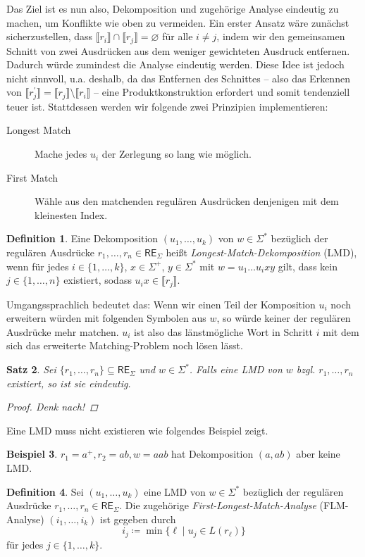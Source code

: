 \documentclass[11pt, a4paper]{article}
\theoremstyle{definition}
\newtheorem{definition}{Definition}[section]
\newtheorem{example}[definition]{Beispiel}
\theoremstyle{plain}
\newtheorem{theorem}[definition]{Satz}
\numberwithin{equation}{section}
\let\emptyset\varnothing
\begin{document}
Das Ziel ist es nun also, Dekomposition und zugehörige Analyse eindeutig zu machen, um Konflikte wie oben zu vermeiden. Ein erster Ansatz wäre zunächst sicherzustellen, dass $\llbracket r_i \rrbracket \cap \llbracket r_j \rrbracket = \emptyset$ für alle $i \neq j$, indem wir den gemeinsamen Schnitt von zwei Ausdrücken aus dem weniger gewichteten Ausdruck entfernen. Dadurch würde zumindest die Analyse eindeutig werden. Diese Idee ist jedoch nicht sinnvoll, u.a. deshalb, da das Entfernen des Schnittes -- also das Erkennen von $\llbracket r_j^\prime \rrbracket = \llbracket r_j \rrbracket \setminus \llbracket r_i \rrbracket$ -- eine Produktkonstruktion erfordert und somit tendenziell teuer ist. Stattdessen werden wir folgende zwei Prinzipien implementieren:
\begin{description}
	\item[Longest Match] Mache jedes $u_i$ der Zerlegung so lang wie möglich.
	\item[First Match] Wähle aus den matchenden regulären Ausdrücken denjenigen mit dem kleinesten Index.
\end{description}
\begin{definition}
	Eine Dekomposition $(u_1, \ldots, u_k)$ von $w \in \Sigma^\ast$ bezüglich der regulären Ausdrücke $r_1, \ldots, r_n \in \mathsf{RE}_\Sigma$ heißt \textit{Longest-Match-Dekomposition} (LMD), wenn für jedes $i \in \{1, \ldots, k\}$, $x \in \Sigma^+$, $y \in \Sigma^\ast$ mit $w = u_1 \ldots u_i x y$ gilt, dass kein $j \in \{1, \ldots, n\}$ existiert, sodass $u_i x \in \llbracket r_j \rrbracket$. 
\end{definition}
Umgangssprachlich bedeutet das: Wenn wir einen Teil der Komposition $u_i$ noch erweitern würden mit folgenden Symbolen aus $w$, so würde keiner der regulären Ausdrücke mehr matchen. $u_i$ ist also das länstmögliche Wort in Schritt $i$ mit dem sich das erweiterte Matching-Problem noch lösen lässt.
\begin{theorem}
	Sei $\{r_1, \ldots, r_n\} \subseteq \mathsf{RE}_\Sigma$ und $w \in \Sigma^\ast$. Falls eine LMD von $w$ bzgl. $r_1, \ldots, r_n$ existiert, so ist sie eindeutig.
	\begin{proof}
		Denk nach!
	\end{proof}
\end{theorem}
Eine LMD muss nicht existieren wie folgendes Beispiel zeigt.
\begin{example}
	$r_1 = a^+, r_2 = ab, w = aab$ hat Dekomposition $(a, ab)$ aber keine LMD.
\end{example}
\begin{definition}
	Sei $(u_1, \ldots, u_k)$ eine LMD von $w \in \Sigma^\ast$ bezüglich der regulären Ausdrücke $r_1, \ldots, r_n \in \mathsf{RE}_\Sigma$. Die zugehörige \textit{First-Longest-Match-Analyse} (FLM-Analyse) $(i_1, \ldots, i_k)$ ist gegeben durch
	$$
		i_j \coloneqq \min \{ \ell \mid u_j \in L(r_\ell) \}
	$$
	für jedes $j \in \{1, \ldots, k\}$.
\end{definition}
\end{document}
